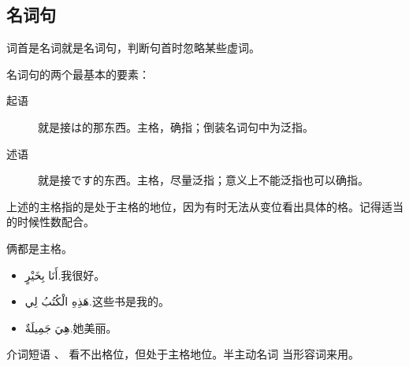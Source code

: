 \subsection{名词句}

词首是名词就是名词句，判断句首时忽略某些虚词。

名词句的两个最基本的要素：

\begin{description}
    \item[起语] 就是接は的那东西。主格，确指；倒装名词句中为泛指。
    \item[述语] 就是接です的东西。主格，尽量泛指；意义上不能泛指也可以确指。
\end{description}

上述的主格指的是处于主格的地位，因为有时无法从变位看出具体的格。记得适当的时候性数配合。

\begin{note}
    俩都是主格。
\end{note}

\begin{itemize}
    \item \ac{أَنَا بِخَيْرٍ.}{我很好。}
    \item \ac{هَذِهِ الْكُتُبُ لِي.}{这些书是我的。}
    \item \ac{هِيَ جَمِيلَةٌ.}{她美丽。}
\end{itemize}

介词短语 、 看不出格位，但处于主格地位。半主动名词 当形容词来用。